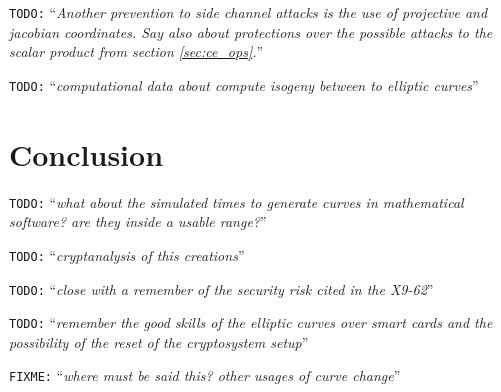 \documentclass[10pt,a4paper,twoside]{llncs}
\newcommand{\todo}[1]{\texttt{\color{red}TODO:} ``\emph{#1}''}
\newcommand{\fixme}[1]{\texttt{\color{red}FIXME:} ``\emph{#1}''}
\begin{document}
\todo{Another prevention to side channel attacks is the use of projective and jacobian coordinates. Say also about protections over the possible attacks to the scalar product from section \ref{sec:ce_ops}.}

\todo{computational data about compute isogeny between to elliptic curves}

\section{Conclusion \label{sec:conclusion}}
\todo{what about the simulated times to generate curves in mathematical software? are they inside a usable range?}

\todo{cryptanalysis of this creations}

\todo{close with a remember of the security risk cited in the X9-62}

\todo{remember the good skills of the elliptic curves over smart cards and the possibility of the reset of the cryptosystem setup}


\fixme{where must be said this? other usages of curve change}





\end{document}
